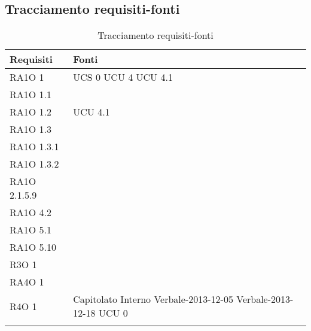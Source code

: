 \subsection{Tracciamento requisiti-fonti}
			\begin{center}
			\bgroup
			\def\arraystretch{1.8}
			\begin{longtable}{ | p{5cm} | p{5cm} |}
		
			\cellcolor[gray]{0.9} \textbf{Requisiti} & \cellcolor[gray]{0.9} \textbf{Fonti} \\ \hline       
				RA1O 1 &  UCS 0 \newline  UCU 4 \newline  UCU 4.1 \newline  \\ \hline      
				RA1O 1.1 &  \\ \hline      
				RA1O 1.2 &  UCU 4.1 \newline  \\ \hline      
				RA1O 1.3 &  \\ \hline      
				RA1O 1.3.1 &  \\ \hline      
				RA1O 1.3.2 &  \\ \hline      
				RA1O 2.1.5.9 &  \\ \hline      
				RA1O 4.2 &  \\ \hline      
				RA1O 5.1 &  \\ \hline      
				RA1O 5.10 &  \\ \hline      
				R3O 1 &  \\ \hline      
				RA4O 1 &  \\ \hline      
				R4O 1 &  Capitolato \newline  Interno \newline  Verbale-2013-12-05 \newline  Verbale-2013-12-18 \newline  UCU 0 \newline  \\ \hline  
			\caption{Tracciamento requisiti-fonti}    
			\end{longtable}
			\egroup
			\end{center}  
\clearpage

